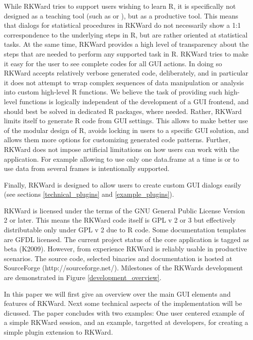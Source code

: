 While RKWard tries to support users wishing to learn R, it is specifically not
designed as a teaching tool (such as  or ), but as a
productive tool. This means that dialogs for statistical procedures in RKWard do
not necessarily show a 1:1 correspondence to the underlying steps in R, but are
rather oriented at statistical tasks. At the same time, RKWard provides a high
level of transparency about the steps that are needed to perform any supported
task in R. RKWard tries to make it easy for the user to see complete codes for
all GUI actions. In doing so RKWard accepts relatively verbose generated code,
deliberately, and in particular it does not attempt to wrap complex sequences of
data manipulation or analysis into custom high-level R functions. We believe the
task of providing such high-level functions is logically independent of the
development of a GUI frontend, and should best be solved in dedicated R
packages, where needed. Rather, RKWard limits itself to generate R code from GUI
settings. This allows to make better use of the modular design of R, avoids
locking in users to a specific GUI solution, and allows them more options for
customizing generated code patterns. Further, RKWard does not impose artificial
limitations on how users can work with the application. For example allowing to
use only one data.frame at a time is or to use data from several frames is
intentionally supported.

Finally, RKWard is designed to allow users to create custom GUI dialogs easily
(see sections \ref{technical_plugins} and \ref{example_plugins}).

RKWard is licensed under the terms of the GNU General Public License Version 2
or later. This means the RKWard code itself is GPL v 2 or 3 but effectively
distributable only under GPL v 2 due to R code. Some documentation templates are
GFDL licensed. The current project status of the core application is tagged as
beta (K2009). However, from experience RKWard is reliably usable in productive
scenarios. The source code, selected binaries and documentation is hosted at
SourceForge (http://sourceforge.net/). Milestones of the RKWards development are
demonstrated in Figure \ref{development_overview}.

In this paper we will first give an overview over the main GUI elements and features
of RKWard. Next some technical aspects of the implementation will be dicussed. The paper
concludes with two examples: One user centered example of a simple RKWard session, and
an example, targetted at developers, for creating a simple plugin extension to RKWard.
